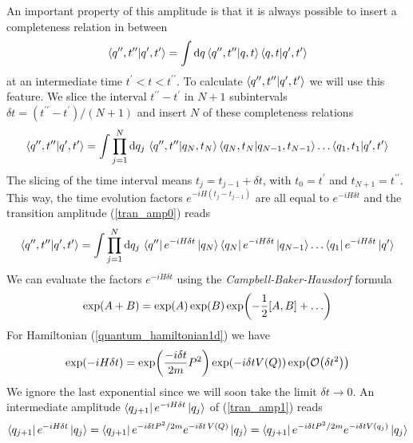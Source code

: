 An important property of this amplitude is that it is always possible to insert a completeness relation in between
\begin{equation}
   \braket{q^{\prime\prime},t^{\prime\prime}}{q^{\prime},t^{\prime}}= \int\dd q\braket{q^{\prime\prime},t^{\prime\prime}}{q,t}\braket{q,t}{q^{\prime},t^{\prime}}
\end{equation}
at an intermediate time $t^\prime<t<t^{\prime\prime}$. To calculate $\braket{q^{\prime\prime},t^{\prime\prime}}{q^{\prime},t^{\prime}}$ we will use this feature. We slice the interval $t^{\prime\prime}-t^{\prime}$ in $N+1$ subintervals
$\delta t=(t^{\prime\prime}-t^{\prime})/(N+1)$ and insert $N$
 of these completeness relations
 \begin{equation}
     \braket{q^{\prime\prime},t^{\prime\prime}}{q^{\prime},t^{\prime}}=\int\prod_{j=1}^{N}\dd q_j\,\braket{q^{\prime\prime},t^{\prime\prime}}{q_N,t_N}\braket{q_N,t_N}{q_{N-1},t_{N-1}}\dots\braket{q_1,t_1}{q^\prime,t^\prime}
     \label{tran_amp0}
\end{equation}
The slicing of the time interval means $t_j=t_{j-1}+\delta t$, with $t_0=t^\prime$ and $t_{N+1}=t^{\prime\prime}$. This way, the time evolution factors $e^{-iH(t_j-t_{j-1})}$ are all equal to $e^{-iH\delta t}$ and the transition amplitude (\ref{tran_amp0}) reads
\begin{equation}
    \braket{q^{\prime\prime},t^{\prime\prime}}{q^{\prime},t^{\prime}}=\int\prod_{j=1}^{N}\dd q_j\,\bra{q^{\prime\prime}}e^{-iH\delta t}\ket{q_N}\bra{q_N}e^{-iH\delta t}\ket{q_{N-1}}\dots\bra{q_1}e^{-iH\delta t}\ket{q^\prime}
    \label{tran_amp1}
\end{equation}
We can evaluate the factors $e^{-iH\delta t}$ using the \textit{Campbell-Baker-Hausdorf} formula
\begin{equation}
    \exp(A+B)=\exp(A)\exp(B)\exp(-\frac{1}{2}\comm{A}{B}+\dots)
\end{equation}
For Hamiltonian (\ref{quantum_hamiltonian1d}) we have
\begin{equation}
    \exp(-iH\delta t)=\exp(\frac{-i\delta t}{2m}P^2)\exp(-i\delta t V(Q))\exp(\order{\delta t^2})
\end{equation}
We ignore the last exponential since we will soon take the limit $\delta t\to0$. An intermediate amplitude $\bra{q_{j+1}}e^{-iH\delta t}\ket{q_j}$ of (\ref{tran_amp1}) reads
\begin{equation}
    \bra{q_{j+1}}e^{-iH\delta t}\ket{q_j}=\bra{q_{j+1}}e^{-i\delta tP^2/2m}e^{-i\delta t\, V(Q)}\ket{q_j}=\bra{q_{j+1}}e^{-i\delta tP^2/2m}e^{-i\delta t V(q_j)}\ket{q_j}
\end{equation}
